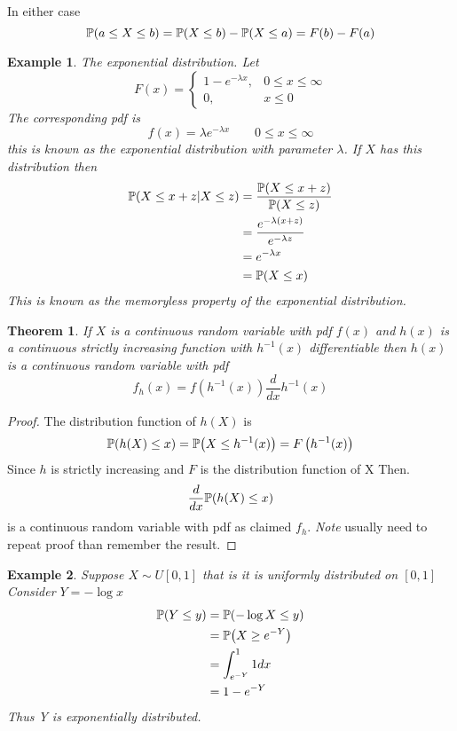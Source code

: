 \documentclass{notes}
\theoremstyle{plain}
\newtheorem{theorem}{Theorem}[chapter]
\newtheorem*{example}{Example}
\newcommand{\bP}{\mathbb{P}}
\newcommand{\prob}[1]{\bP \negthinspace\left(#1\right)}
\begin{document}
\vspace{2in}

In either case
\[
\prob{a\le X\leq b} = \prob{X \leq b} - \prob{X\leq a} = F(b) - F(a)
\]
\begin{example} The exponential distribution. Let
\begin{equation}
F(x) = 
\begin{cases}
1-e^{-\lambda x}, &0\leq x \leq \infty\\
0, &x \le 0
\end{cases}
\end{equation}
The corresponding pdf is
\[
f(x) = \lambda e^{-\lambda x} \qquad 0\leq x \leq \infty
\]
this is known as the exponential distribution with parameter
$\lambda$. If $X$ has this distribution then
\begin{align*}
\prob{X\le x+z|X\le z} &= \frac{\prob{X\le x+z}}{\prob{X\le z}}\\
&=\frac{e^{-\lambda (x+z)}}{e^{-\lambda z}}\\
&= e^{-\lambda x}\\
&= \prob{X\le x}
\end{align*}
This is known as the memoryless property of the exponential distribution.
\end{example}
\begin{theorem}
If $X$ is a continuous random variable with pdf $f(x)$ and $h(x)$ is a 
continuous strictly increasing function with $h^{-1}(x)$
differentiable then $h(x)$ is a continuous random variable with pdf 
\[
f_h(x) = f\left(h^{-1}(x)\right)\frac{d}{dx}h^{-1}(x)
\]
 \end{theorem}
\begin{proof}
\vspace{2in}

The distribution function of $h(X)$ is
\[
\prob{h(X) \leq x} = \prob{X \leq h^{-1}(x)} = F\left(h^{-1}(x) \right)
\]
Since $h$ is strictly increasing and $F$ is the distribution function of
X Then.
\[
\frac{d}{dx} \prob{h(X) \leq x} 
\]
is a continuous random variable with pdf as claimed $f_h$. \emph{Note} 
usually need to repeat proof than remember the result.
\end{proof}
\begin{example}
Suppose $X \sim U[0,1]$ that is it is uniformly distributed on
$[0,1]$ Consider $Y=-\log x$ 
\begin{align*}
\prob{Y\leq y} &= \prob{-\log X \leq y}\\
&= \prob{X \geq e^{-Y}}\\
&= \int_{ e^{-Y}}^1 1 dx\\
&= 1- e^{-Y}
\end{align*}
Thus Y is exponentially distributed.
\end{example}
\end{document}
